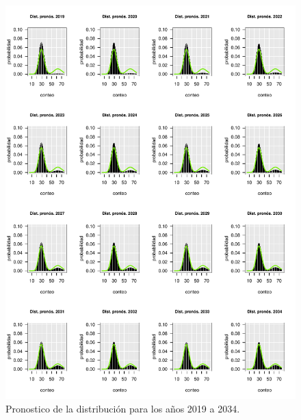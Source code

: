 \documentclass[a4paper]{article}\usepackage[]{graphicx}\usepackage[]{color}
\makeatletter
\def\maxwidth{ %
  \ifdim\Gin@nat@width>\linewidth
    \linewidth
  \else
    \Gin@nat@width
  \fi
}
\newenvironment{knitrout}{}{} %
\makeatother
\begin{document}
\begin{knitrout}
\color{fgcolor}\begin{figure}
\includegraphics[width=\maxwidth]{figure/unnamed-chunk-20-1} \caption[Pronostico de la distribución para los años 2019 a 2034]{Pronostico de la distribución para los años 2019 a 2034.}\label{fig:unnamed-chunk-20}
\end{figure}


\end{knitrout}
\end{document}

